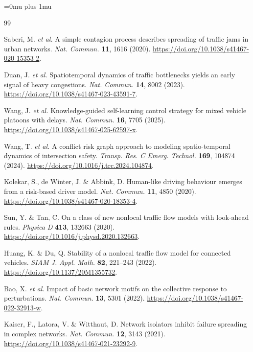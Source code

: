 \documentclass[10pt,a4paper,twocolumn]{article}
\begin{document}
\begingroup
\sloppy
\raggedright
\Urlmuskip=0mu plus 1mu\relax
\begin{thebibliography}{99}

Saberi, M. \textit{et al.} A simple contagion process describes spreading of traffic jams in urban networks. \textit{Nat. Commun.} \textbf{11}, 1616 (2020). \url{https://doi.org/10.1038/s41467-020-15353-2}.

Duan, J. \textit{et al.} Spatiotemporal dynamics of traffic bottlenecks yields an early signal of heavy congestions. \textit{Nat. Commun.} \textbf{14}, 8002 (2023). \url{https://doi.org/10.1038/s41467-023-43591-7}.

Wang, J. \textit{et al.} Knowledge-guided self-learning control strategy for mixed vehicle platoons with delays. \textit{Nat. Commun.} \textbf{16}, 7705 (2025). \url{https://doi.org/10.1038/s41467-025-62597-x}.

Wang, T. \textit{et al.} A conflict risk graph approach to modeling spatio-temporal dynamics of intersection safety. \textit{Transp. Res. C Emerg. Technol.} \textbf{169}, 104874 (2024). \url{https://doi.org/10.1016/j.trc.2024.104874}.

Kolekar, S., de Winter, J. \& Abbink, D. Human-like driving behaviour emerges from a risk-based driver model. \textit{Nat. Commun.} \textbf{11}, 4850 (2020). \url{https://doi.org/10.1038/s41467-020-18353-4}.

Sun, Y. \& Tan, C. On a class of new nonlocal traffic flow models with look-ahead rules. \textit{Physica D} \textbf{413}, 132663 (2020). \url{https://doi.org/10.1016/j.physd.2020.132663}.

Huang, K. \& Du, Q. Stability of a nonlocal traffic flow model for connected vehicles. \textit{SIAM J. Appl. Math.} \textbf{82}, 221--243 (2022). \url{https://doi.org/10.1137/20M1355732}.

Bao, X. \textit{et al.} Impact of basic network motifs on the collective response to perturbations. \textit{Nat. Commun.} \textbf{13}, 5301 (2022). \url{https://doi.org/10.1038/s41467-022-32913-w}.

Kaiser, F., Latora, V. \& Witthaut, D. Network isolators inhibit failure spreading in complex networks. \textit{Nat. Commun.} \textbf{12}, 3143 (2021). \url{https://doi.org/10.1038/s41467-021-23292-9}.


\end{thebibliography}
\end{document}
